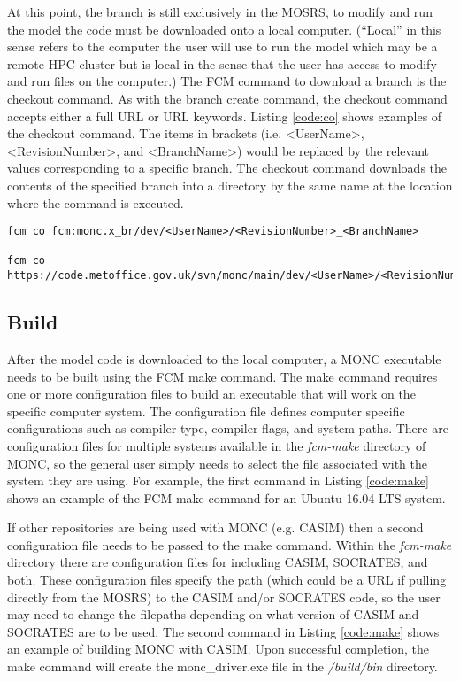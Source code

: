 At this point, the branch is still exclusively in the MOSRS, to modify and run the model the code must be downloaded onto a local computer. (``Local'' in this sense refers to the computer the user will use to run the model which may be a remote HPC cluster but is local in the sense that the user has access to modify and run files on the computer.) The FCM command to download a branch is the checkout command. As with the branch create command, the checkout command accepts either a full URL or URL keywords. Listing \ref{code:co} shows examples of the checkout command. The items in brackets (i.e. <UserName>, <RevisionNumber>, and <BranchName>) would be replaced by the relevant values corresponding to a specific branch. The checkout command downloads the contents of the specified branch into a directory by the same name at the location where the command is executed. \citep{moncGuides}

\begin{lstlisting}[caption={Example of FCM command to checkout a branch. Both commands produce the same results the only difference is that the second uses a keyword in place of the full URL. In each case <UserName>, <RevisionNumber>, and <BranchName> would be replaced by the relevant values corresponding to a specific branch},label={code:co},belowskip=-1cm]
fcm co fcm:monc.x_br/dev/<UserName>/<RevisionNumber>_<BranchName>

fcm co https://code.metoffice.gov.uk/svn/monc/main/dev/<UserName>/<RevisionNumber>_<BranchName>
\end{lstlisting}

\subsection{Build}
After the model code is downloaded to the local computer, a MONC executable needs to be built using the FCM make command. The make command requires one or more configuration files to build an executable that will work on the specific computer system. The configuration file defines computer specific configurations such as compiler type, compiler flags, and system paths. There are configuration files for multiple systems available in the \textit{fcm-make} directory of MONC, so the general user simply needs to select the file associated with the system they are using. For example, the first command in Listing \ref{code:make} shows an example of the FCM make command for an Ubuntu 16.04 LTS system. \citep{moncGuides}

If other repositories are being used with MONC (e.g. CASIM) then a second configuration file needs to be passed to the make command. Within the \textit{fcm-make} directory there are configuration files for including CASIM, SOCRATES, and both. These configuration files specify the path (which could be a URL if pulling directly from the MOSRS) to the CASIM and/or SOCRATES code, so the user may need to change the filepaths depending on what version of CASIM and SOCRATES are to be used. The second command in Listing \ref{code:make} shows an example of building MONC with CASIM. Upon successful completion, the make command will create the monc\_driver.exe file in the \textit{/build/bin} directory. \citep{moncGuides}

